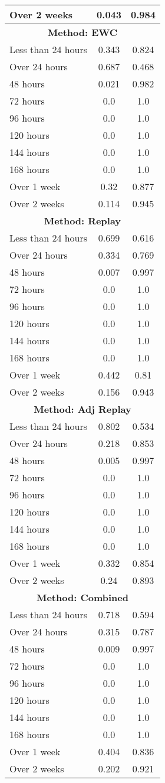 \documentclass{article}
\begin{document}
\begin{longtable}{lcc}
Over 2 weeks & 0.043 & 0.984 \\
\midrule
\multicolumn{3}{c}{\textbf{Method: EWC}} \\
\midrule
Less than 24 hours & 0.343 & 0.824 \\
Over 24 hours & 0.687 & 0.468 \\
48 hours & 0.021 & 0.982 \\
72 hours & 0.0 & 1.0 \\
96 hours & 0.0 & 1.0 \\
120 hours & 0.0 & 1.0 \\
144 hours & 0.0 & 1.0 \\
168 hours & 0.0 & 1.0 \\
Over 1 week & 0.32 & 0.877 \\
Over 2 weeks & 0.114 & 0.945 \\
\midrule
\multicolumn{3}{c}{\textbf{Method: Replay}} \\
\midrule
Less than 24 hours & 0.699 & 0.616 \\
Over 24 hours & 0.334 & 0.769 \\
48 hours & 0.007 & 0.997 \\
72 hours & 0.0 & 1.0 \\
96 hours & 0.0 & 1.0 \\
120 hours & 0.0 & 1.0 \\
144 hours & 0.0 & 1.0 \\
168 hours & 0.0 & 1.0 \\
Over 1 week & 0.442 & 0.81 \\
Over 2 weeks & 0.156 & 0.943 \\
\midrule
\multicolumn{3}{c}{\textbf{Method: Adj Replay}} \\
\midrule
Less than 24 hours & 0.802 & 0.534 \\
Over 24 hours & 0.218 & 0.853 \\
48 hours & 0.005 & 0.997 \\
72 hours & 0.0 & 1.0 \\
96 hours & 0.0 & 1.0 \\
120 hours & 0.0 & 1.0 \\
144 hours & 0.0 & 1.0 \\
168 hours & 0.0 & 1.0 \\
Over 1 week & 0.332 & 0.854 \\
Over 2 weeks & 0.24 & 0.893 \\
\midrule
\multicolumn{3}{c}{\textbf{Method: Combined}} \\
\midrule
Less than 24 hours & 0.718 & 0.594 \\
Over 24 hours & 0.315 & 0.787 \\
48 hours & 0.009 & 0.997 \\
72 hours & 0.0 & 1.0 \\
96 hours & 0.0 & 1.0 \\
120 hours & 0.0 & 1.0 \\
144 hours & 0.0 & 1.0 \\
168 hours & 0.0 & 1.0 \\
Over 1 week & 0.404 & 0.836 \\
Over 2 weeks & 0.202 & 0.921 \\
\bottomrule
\end{longtable}
\end{document}
